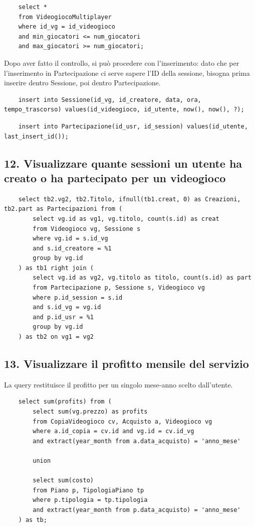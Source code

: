 \documentclass[a4paper,12pt]{report}
\begin{document}
    \begin{lstlisting}
    select *
    from VideogiocoMultiplayer
    where id_vg = id_videogioco
    and min_giocatori <= num_giocatori
    and max_giocatori >= num_giocatori;
    \end{lstlisting}

Dopo aver fatto il controllo, si può procedere con l'inserimento: dato che per l'inserimento in Partecipazione ci serve sapere l'ID della sessione, bisogna prima inserire dentro Sessione, poi dentro Partecipazione.

    \begin{lstlisting}
    insert into Sessione(id_vg, id_creatore, data, ora, tempo_trascorso) values(id_videogioco, id_utente, now(), now(), ?);
    \end{lstlisting}
    
    \begin{lstlisting}
    insert into Partecipazione(id_usr, id_session) values(id_utente, last_insert_id());
    \end{lstlisting}
    
\subsection*{12. Visualizzare quante sessioni un utente ha creato o ha partecipato per un videogioco}

    \begin{lstlisting}
    select tb2.vg2, tb2.Titolo, ifnull(tb1.creat, 0) as Creazioni, tb2.part as Partecipazioni from (
        select vg.id as vg1, vg.titolo, count(s.id) as creat
        from Videogioco vg, Sessione s
        where vg.id = s.id_vg
        and s.id_creatore = %1
        group by vg.id
    ) as tb1 right join (
        select vg.id as vg2, vg.titolo as titolo, count(s.id) as part
        from Partecipazione p, Sessione s, Videogioco vg
        where p.id_session = s.id
        and s.id_vg = vg.id
        and p.id_usr = %1
        group by vg.id
    ) as tb2 on vg1 = vg2
    \end{lstlisting}

\subsection*{13. Visualizzare il profitto mensile del servizio}

La query restituisce il profitto per un singolo mese-anno scelto dall'utente.

    \begin{lstlisting}
    select sum(profits) from (
        select sum(vg.prezzo) as profits
        from CopiaVideogioco cv, Acquisto a, Videogioco vg
        where a.id_copia = cv.id and vg.id = cv.id_vg
        and extract(year_month from a.data_acquisto) = 'anno_mese'

        union

        select sum(costo)
        from Piano p, TipologiaPiano tp
        where p.tipologia = tp.tipologia
        and extract(year_month from p.data_acquisto) = 'anno_mese'
    ) as tb;
    \end{lstlisting}
\end{document}
